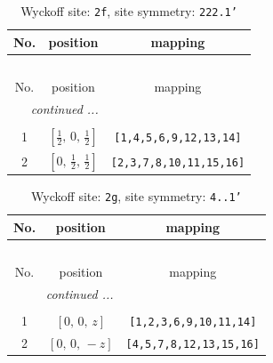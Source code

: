 \documentclass[fleqn,8pt]{jsarticle}
\begin{document}
\renewcommand{\arraystretch}{1.2}
\begin{longtable}{ccc}
\caption{Wyckoff site: {\tt 2f}, site symmetry: {\tt 222.1'}}
 \\
 \hline \hline
No. & position & mapping \\ \hline \endfirsthead

\multicolumn{2}{l}{\tablename\ \thetable{}} \\
 \hline \hline
No. & position & mapping \\ \hline \endhead

 \hline \hline
\multicolumn{2}{r}{\footnotesize\it continued ...} \\ \endfoot

 \hline \hline
\multicolumn{2}{r}{} \\ \endlastfoot

1 & $\left[ \frac{1}{2},\, 0,\, \frac{1}{2} \right]$ & {\tt [1,4,5,6,9,12,13,14]} \\ \hline
2 & $\left[ 0,\, \frac{1}{2},\, \frac{1}{2} \right]$ & {\tt [2,3,7,8,10,11,15,16]} \\
\end{longtable}
\renewcommand{\arraystretch}{1.2}
\begin{longtable}{ccc}
\caption{Wyckoff site: {\tt 2g}, site symmetry: {\tt 4..1'}}
 \\
 \hline \hline
No. & position & mapping \\ \hline \endfirsthead

\multicolumn{2}{l}{\tablename\ \thetable{}} \\
 \hline \hline
No. & position & mapping \\ \hline \endhead

 \hline \hline
\multicolumn{2}{r}{\footnotesize\it continued ...} \\ \endfoot

 \hline \hline
\multicolumn{2}{r}{} \\ \endlastfoot

1 & $\left[ 0,\, 0,\, z \right]$ & {\tt [1,2,3,6,9,10,11,14]} \\ \hline
2 & $\left[ 0,\, 0,\, - z \right]$ & {\tt [4,5,7,8,12,13,15,16]} \\
\end{longtable}
\renewcommand{\arraystretch}{1.2}
\end{document}
